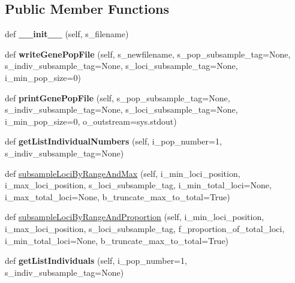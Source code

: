 \subsection*{Public Member Functions}
\begin{DoxyCompactItemize}
\item 
def {\bfseries \+\_\+\+\_\+init\+\_\+\+\_\+} (self, s\+\_\+filename)\hypertarget{classnegui_1_1genepopfilemanager_1_1GenepopFileManager_a8563b3299666d02d45c9acd64f450c51}{}\label{classnegui_1_1genepopfilemanager_1_1GenepopFileManager_a8563b3299666d02d45c9acd64f450c51}

\item 
def {\bfseries write\+Gene\+Pop\+File} (self, s\+\_\+newfilename, s\+\_\+pop\+\_\+subsample\+\_\+tag=None, s\+\_\+indiv\+\_\+subsample\+\_\+tag=None, s\+\_\+loci\+\_\+subsample\+\_\+tag=None, i\+\_\+min\+\_\+pop\+\_\+size=0)\hypertarget{classnegui_1_1genepopfilemanager_1_1GenepopFileManager_a7390cad5840454284e816679a87d84df}{}\label{classnegui_1_1genepopfilemanager_1_1GenepopFileManager_a7390cad5840454284e816679a87d84df}

\item 
def {\bfseries print\+Gene\+Pop\+File} (self, s\+\_\+pop\+\_\+subsample\+\_\+tag=None, s\+\_\+indiv\+\_\+subsample\+\_\+tag=None, s\+\_\+loci\+\_\+subsample\+\_\+tag=None, i\+\_\+min\+\_\+pop\+\_\+size=0, o\+\_\+outstream=sys.\+stdout)\hypertarget{classnegui_1_1genepopfilemanager_1_1GenepopFileManager_a45625a9221c61af610b495b43c235099}{}\label{classnegui_1_1genepopfilemanager_1_1GenepopFileManager_a45625a9221c61af610b495b43c235099}

\item 
def {\bfseries get\+List\+Individual\+Numbers} (self, i\+\_\+pop\+\_\+number=1, s\+\_\+indiv\+\_\+subsample\+\_\+tag=None)\hypertarget{classnegui_1_1genepopfilemanager_1_1GenepopFileManager_a652029f0a6e0668e0b75c9683dae0ffd}{}\label{classnegui_1_1genepopfilemanager_1_1GenepopFileManager_a652029f0a6e0668e0b75c9683dae0ffd}

\item 
def \hyperlink{classnegui_1_1genepopfilemanager_1_1GenepopFileManager_ae846be6c9adb2da1346bacaa54b0e2e7}{subsample\+Loci\+By\+Range\+And\+Max} (self, i\+\_\+min\+\_\+loci\+\_\+position, i\+\_\+max\+\_\+loci\+\_\+position, s\+\_\+loci\+\_\+subsample\+\_\+tag, i\+\_\+min\+\_\+total\+\_\+loci=None, i\+\_\+max\+\_\+total\+\_\+loci=None, b\+\_\+truncate\+\_\+max\+\_\+to\+\_\+total=True)
\item 
def \hyperlink{classnegui_1_1genepopfilemanager_1_1GenepopFileManager_a644341072c4d09bbbb1eec4aefbf29f1}{subsample\+Loci\+By\+Range\+And\+Proportion} (self, i\+\_\+min\+\_\+loci\+\_\+position, i\+\_\+max\+\_\+loci\+\_\+position, s\+\_\+loci\+\_\+subsample\+\_\+tag, f\+\_\+proportion\+\_\+of\+\_\+total\+\_\+loci, i\+\_\+min\+\_\+total\+\_\+loci=None, b\+\_\+truncate\+\_\+max\+\_\+to\+\_\+total=True)
\item 
def {\bfseries get\+List\+Individuals} (self, i\+\_\+pop\+\_\+number=1, s\+\_\+indiv\+\_\+subsample\+\_\+tag=None)\hypertarget{classnegui_1_1genepopfilemanager_1_1GenepopFileManager_aa6993dde24163002aeae55005437711d}{}\label{classnegui_1_1genepopfilemanager_1_1GenepopFileManager_aa6993dde24163002aeae55005437711d}


\end{DoxyCompactItemize}
